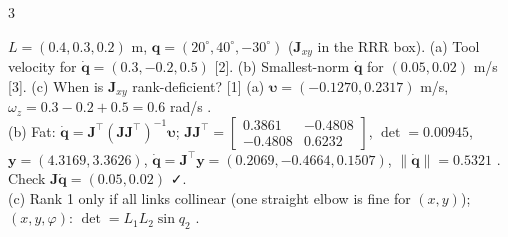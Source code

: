 \begin{multicols}{3}
\begin{examq}
$L=(0.4,0.3,0.2)$ m, $\mathbf q=(20^\circ,40^\circ,-30^\circ)$ ($\mathbf J_{xy}$ in the RRR box). (a) Tool velocity for $\dot{\mathbf q}=(0.3,-0.2,0.5)$ [2]. (b) Smallest-norm $\dot{\mathbf q}$ for $(0.05,0.02)$ m/s [3]. (c) When is $\mathbf J_{xy}$ rank-deficient? [1]
\solution
(a) $\boldsymbol\upsilon=(-0.1270,0.2317)$ m/s, $\omega_z=0.3-0.2+0.5=0.6$ rad/s .\\
(b) Fat: $\dot{\mathbf q}=\mathbf J^\top(\mathbf J\mathbf J^\top)^{-1}\boldsymbol\upsilon$; $\mathbf J\mathbf J^\top=\begin{bmatrix}0.3861&-0.4808\\-0.4808&0.6232\end{bmatrix}$, $\det=0.00945$, $\mathbf y=(4.3169,3.3626)$, $\dot{\mathbf q}=\mathbf J^\top\mathbf y=(0.2069,-0.4664,0.1507)$, $\|\dot{\mathbf q}\|=0.5321$ . Check $\mathbf J\dot{\mathbf q}=(0.05,0.02)$ ✓.\\
(c) Rank 1 only if all links collinear (one straight elbow is fine for $(x,y)$); $(x,y,\varphi)$: $\det=L_1L_2\sin q_2$ . \chk
\end{examq}

\end{multicols}
